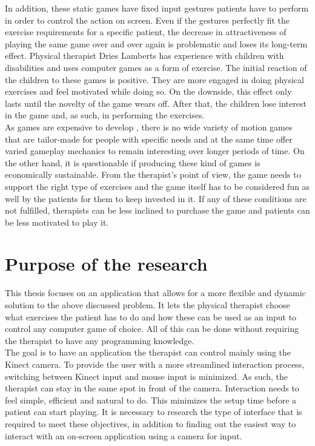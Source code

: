 In addition, these static games have fixed input gestures patients have to perform in order to control the action on screen. Even if the gestures perfectly fit the exercise requirements for a specific patient, the decrease in attractiveness of playing the same game over and over again is problematic and loses its long-term effect. Physical therapist Dries Lamberts has experience with children with disabilities and uses computer games as a form of exercise. The initial reaction of the children to these games is positive. They are more engaged in doing physical exercises and feel motivated while doing so. On the downside, this effect only lasts until the novelty of the game wears off. After that, the children lose interest in the game and, as such, in performing the exercises.\\

As games are expensive to develop \cite{Nakevska2011}, there is no wide variety of motion games that are tailor-made for people with specific needs and at the same time offer varied gameplay mechanics to remain interesting over longer periods of time. On the other hand, it is questionable if producing these kind of games is economically sustainable. From the therapist's point of view, the game needs to support the right type of exercises and the game itself has to be considered fun as well by the patients for them to keep invested in it. If any of these conditions are not fulfilled, therapists can be less inclined to purchase the game and patients can be less motivated to play it.\\


\section{Purpose of the research}

This thesis focuses on an application that allows for a more flexible and dynamic solution to the above discussed problem. It lets the physical therapist choose what exercises the patient has to do and how these can be used as an input to control any computer game of choice. All of this can be done without requiring the therapist to have any programming knowledge.\\

The goal is to have an application the therapist can control mainly using the Kinect camera. To provide the user with a more streamlined interaction process, switching between Kinect input and mouse input is minimized. As such, the therapist can stay in the same spot in front of the camera. Interaction needs to feel simple, efficient and natural to do. This minimizes the setup time before a patient can start playing. It is necessary to research the type of interface that is required to meet these objectives, in addition to finding out the easiest way to interact with an on-screen application using a camera for input.